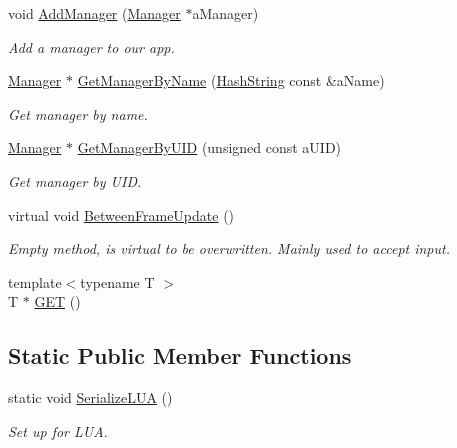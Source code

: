 \begin{DoxyCompactItemize}
void \hyperlink{classGameApp_a713266a89e75cf9ae404669e3b1a7b90}{Add\+Manager} (\hyperlink{classManager}{Manager} $\ast$a\+Manager)
\begin{DoxyCompactList}\small\item\em Add a manager to our app. \end{DoxyCompactList}\item 
\hyperlink{classManager}{Manager} $\ast$ \hyperlink{classGameApp_ab949b77027e277a50e24fa89012c2caa}{Get\+Manager\+By\+Name} (\hyperlink{classHashString}{Hash\+String} const \&a\+Name)
\begin{DoxyCompactList}\small\item\em Get manager by name. \end{DoxyCompactList}\item 
\hyperlink{classManager}{Manager} $\ast$ \hyperlink{classGameApp_ab808fc74577a4587a4f6ee73c3c69be3}{Get\+Manager\+By\+U\+ID} (unsigned const a\+U\+ID)
\begin{DoxyCompactList}\small\item\em Get manager by U\+ID. \end{DoxyCompactList}\item 
virtual void \hyperlink{classGameApp_ab1e4eaff4d945208d165200548d14701}{Between\+Frame\+Update} ()
\begin{DoxyCompactList}\small\item\em Empty method, is virtual to be overwritten. Mainly used to accept input. \end{DoxyCompactList}\item 
{\footnotesize template$<$typename T $>$ }\\T $\ast$ \hyperlink{classGameApp_ae1ccb8e195c635111307a01e34dc1b52}{G\+ET} ()
\end{DoxyCompactItemize}
\subsection*{Static Public Member Functions}
\begin{DoxyCompactItemize}
\item 
static void \hyperlink{classGameApp_afe3bacc27a9604d9ed7c213b45d501c8}{Serialize\+L\+UA} ()
\begin{DoxyCompactList}\small\item\em Set up for L\+UA. \end{DoxyCompactList}\end{DoxyCompactItemize}
